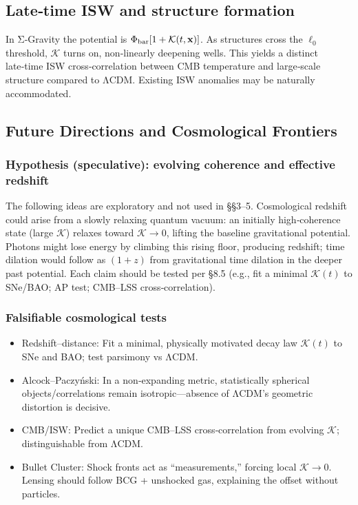 \documentclass[11pt,a4paper]{article}
\begin{document}
\subsection{Late‑time ISW and structure formation}


In Σ‑Gravity the potential is $\allowbreak \Phi_{\rm bar}[1+\mathcal{K}(t,\mathbf{x})]$\allowbreak . As structures cross the $\ell_0$ threshold, $\mathcal{K}$ turns on, non‑linearly deepening wells. This yields a distinct late‑time ISW cross‑correlation between CMB temperature and large‑scale structure compared to ΛCDM. Existing ISW anomalies may be naturally accommodated.


\subsection{Future Directions and Cosmological Frontiers}


\subsubsection{Hypothesis (speculative): evolving coherence and effective redshift}


The following ideas are exploratory and not used in §§3–5. Cosmological redshift could arise from a slowly relaxing quantum vacuum: an initially high‑coherence state (large $\mathcal{K}$) relaxes toward $\mathcal{K}\to0$, lifting the baseline gravitational potential. Photons might lose energy by climbing this rising floor, producing redshift; time dilation would follow as $(1+z)$ from gravitational time dilation in the deeper past potential. Each claim should be tested per §8.5 (e.g., fit a minimal $\mathcal{K}(t)$ to SNe/BAO; AP test; CMB–LSS cross‑correlation).


\subsubsection{Falsifiable cosmological tests}


\begin{itemize}
\item Redshift–distance: Fit a minimal, physically motivated decay law $\mathcal{K}(t)$ to SNe and BAO; test parsimony vs ΛCDM.
\item Alcock–Paczyński: In a non‑expanding metric, statistically spherical objects/correlations remain isotropic—absence of ΛCDM’s geometric distortion is decisive.
\item CMB/ISW: Predict a unique CMB–LSS cross‑correlation from evolving $\mathcal{K}$; distinguishable from ΛCDM.
\item Bullet Cluster: Shock fronts act as “measurements,” forcing local $\mathcal{K}\to0$. Lensing should follow BCG + unshocked gas, explaining the offset without particles.
\end{itemize}
\end{document}
